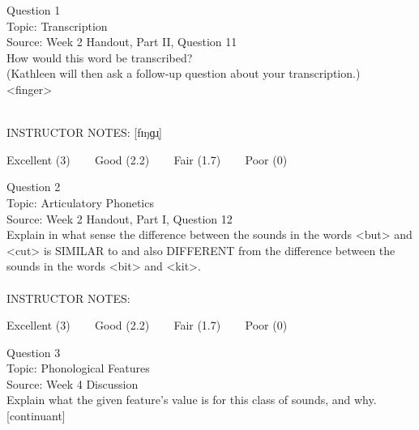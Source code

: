 \documentclass[12pt]{article}
\begin{document}
\begin{center}
\textbf{{\color{blue}{\HUGE START OF EXAM\\}}}

\textbf{{\color{blue}{\HUGE Student ID: 23071\\}}}

\textbf{{\color{blue}{\HUGE \\}}}

\end{center}
\newpage

{\large Question 1}\\

Topic: Transcription\\
Source: Week 2 Handout, Part II, Question 11\\

How would this word be transcribed?\\ (Kathleen will then ask a follow-up question about your transcription.)\\

<finger>


~\\
INSTRUCTOR NOTES: [fɪŋɡɹ̩]


\vfill
Excellent (3) ~~~ Good (2.2) ~~~ Fair (1.7) ~~~ Poor (0)
\newpage

{\large Question 2}\\

Topic: Articulatory Phonetics\\
Source: Week 2 Handout, Part I, Question 12\\

Explain in what sense the difference between the sounds in the words <but> and <cut> is SIMILAR to and also DIFFERENT from the difference between the sounds in the words <bit> and <kit>.\\


~\\
INSTRUCTOR NOTES: 


\vfill
Excellent (3) ~~~ Good (2.2) ~~~ Fair (1.7) ~~~ Poor (0)
\newpage

{\large Question 3}\\

Topic: Phonological Features\\
Source: Week 4 Discussion\\

Explain what the given feature’s value is for this class of sounds, and why.\\

{[continuant]}
\end{document}
